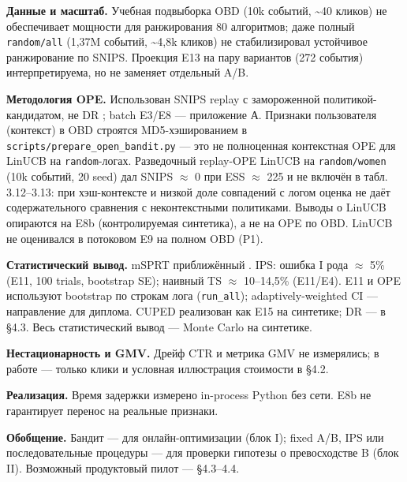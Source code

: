 \textbf{Данные и масштаб.} Учебная подвыборка OBD (10k событий, \textasciitilde40 кликов) не обеспечивает мощности для ранжирования 80 алгоритмов; даже полный \texttt{random/all} (1,37M событий, \textasciitilde4,8k кликов) не стабилизировал устойчивое ранжирование по SNIPS. Проекция E13 на пару вариантов (272 события) интерпретируема, но не заменяет отдельный A/B.

\textbf{Методология OPE.} Использован SNIPS replay с замороженной политикой-кандидатом, не DR \cite{ref27}; batch E3/E8 --- приложение А. Признаки пользователя (контекст) в OBD строятся MD5-хэшированием в \texttt{scripts/prepare\_open\_bandit.py} --- это не полноценная контекстная OPE для LinUCB на \texttt{random}-логах. Разведочный replay-OPE LinUCB на \texttt{random/women} (10k событий, 20 seed) дал SNIPS $\approx$ 0 при ESS $\approx$ 225 и не включён в табл. 3.12--3.13: при хэш-контексте и низкой доле совпадений с логом оценка не даёт содержательного сравнения с неконтекстными политиками. Выводы о LinUCB опираются на E8b (контролируемая синтетика), а не на OPE по OBD. LinUCB не оценивался в потоковом E9 на полном OBD (P1).

\textbf{Статистический вывод.} mSPRT приближённый \cite{ref19}. IPS: ошибка I рода $\approx$ 5\% (E11, 100 trials, bootstrap SE); наивный TS $\approx$ 10--14,5\% (E11/E4). E11 и OPE используют bootstrap по строкам лога (\texttt{run\_all}); adaptively-weighted CI \cite{ref41} --- направление для диплома. CUPED \cite{ref7} реализован как E15 на синтетике; DR \cite{ref27} --- в §4.3. Весь статистический вывод --- Monte Carlo на синтетике.

\textbf{Нестационарность и GMV.} Дрейф CTR и метрика GMV не измерялись; в работе --- только клики и условная иллюстрация стоимости в §4.2.

\textbf{Реализация.} Время задержки измерено in-process Python без сети. E8b не гарантирует перенос на реальные признаки.

\textbf{Обобщение.} Бандит --- для онлайн-оптимизации (блок I); fixed A/B, IPS или последовательные процедуры --- для проверки гипотезы о превосходстве B (блок II). Возможный продуктовый пилот --- §4.3--4.4.
